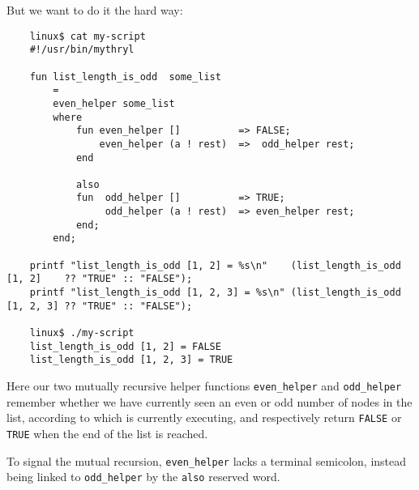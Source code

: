 But we want to do it the hard way:

\begin{verbatim}
    linux$ cat my-script
    #!/usr/bin/mythryl

    fun list_length_is_odd  some_list
        =
        even_helper some_list
        where
            fun even_helper []          => FALSE;
                even_helper (a ! rest)  =>  odd_helper rest;
            end

            also
            fun  odd_helper []          => TRUE;
                 odd_helper (a ! rest)  => even_helper rest;
            end;
        end;

    printf "list_length_is_odd [1, 2] = %s\n"    (list_length_is_odd [1, 2]    ?? "TRUE" :: "FALSE");
    printf "list_length_is_odd [1, 2, 3] = %s\n" (list_length_is_odd [1, 2, 3] ?? "TRUE" :: "FALSE");

    linux$ ./my-script
    list_length_is_odd [1, 2] = FALSE
    list_length_is_odd [1, 2, 3] = TRUE
\end{verbatim}

Here our two mutually recursive helper functions {\tt even\_helper} and {\tt odd\_helper} 
remember whether we have currently seen an even or odd number of nodes in the list, 
according to which is currently executing, and respectively return {\tt FALSE} or {\tt TRUE} 
when the end of the list is reached.

To signal the mutual recursion, {\tt even\_helper} lacks a terminal semicolon, instead 
being linked to {\tt odd\_helper} by the {\tt also} reserved word.

\cutend*

